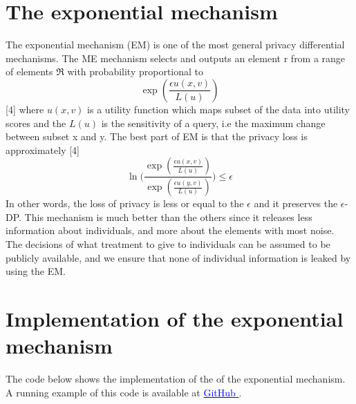 \documentclass[a4paper, 12pt]{extarticle}
\begin{document}
\section*{The exponential mechanism}
The exponential mechanism (EM) is one of the most general privacy differential mechanisms. The ME mechanism selects and outputs an element r from a range of elements $\mathfrak{R}$ with probability proportional to 
$$ \exp(\frac{\epsilon u(x,v)}{L(u)}) $$
[4] where $u(x,v)$ is a utility function which maps subset of the data into utility scores and the $L(u)$ is the sensitivity of a query, i.e the maximum change between subset x and y. The best part of EM is that the privacy loss is approximately [4]
$$ \ln \Bigg( \frac{\exp(\frac{\epsilon u(x,v)}{L(u)}) }{\exp(\frac{\epsilon u(y,v)}{L(u)}) } \Bigg) \leq \epsilon$$
In other words, the loss of privacy is less or equal to the $\epsilon$ and it preserves the $\epsilon$-DP. This mechanism is much better than the others since it releases less information about individuals, and more about the elements with most noise. The decisions of what treatment to give to individuals can be assumed to be publicly available, and we ensure that none of individual information is leaked by using the EM. 

\section*{Implementation of the exponential mechanism}
The code below shows the implementation of the of the exponential mechanism. A running example of this code is available at
\href{https://github.com/rohullaa/fairness_and_privacy}{ \textcolor{blue}{GitHub} }.
\newpage
\end{document}
